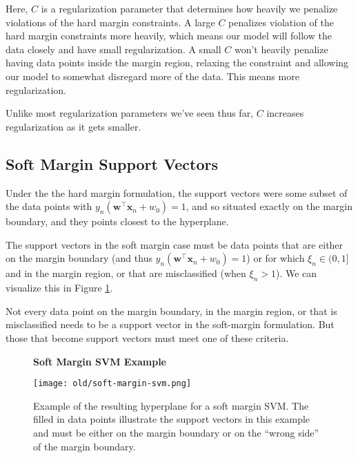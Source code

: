 Here, $C$ is a regularization parameter that determines how heavily we penalize violations of the hard margin constraints. A large $C$ penalizes violation of the hard margin constraints more heavily, which means our model will follow the data closely and have small regularization. A small $C$ won't heavily penalize having data points inside the margin region, relaxing the constraint and allowing our model to somewhat disregard more of the data. This means more regularization.

\begin{warning}
    Unlike most regularization parameters we've seen thus far, $C$ increases regularization as it gets smaller.
\end{warning}

\subsection{Soft Margin Support Vectors}
Under the the hard margin formulation, the support vectors were some subset of the  data points with $y_{n}(\textbf{w}^\top\textbf{x}_{n} + w_{0})=1$,
and so situated exactly on the margin boundary,  and  they points
closest to the hyperplane.

The support vectors in the soft margin case must be data points that are either  on the margin boundary (and thus $y_{n}(\textbf{w}^\top\textbf{x}_{n} + w_{0})=1$) or for which $\xi_n\in (0,1]$ and in the margin region, or that are misclassified (when $\xi_{n} > 1$). We can visualize this in Figure \ref{fig:soft-margin-svm}.


\begin{warning}
  Not every data point on the margin boundary, in the margin region, or that is misclassified needs to be a support vector in the soft-margin formulation. But those that become support vectors must meet one of these criteria.
\end{warning}
%
\begin{figure}
    \centering
    \textbf{Soft Margin SVM Example}\par\medskip
    \texttt{[image: old/soft-margin-svm.png]}
    \caption{Example of the resulting hyperplane for a soft margin SVM. The filled in data points illustrate the support vectors in this example and must be either on the margin boundary or on the ``wrong side'' of the margin boundary.}
    \label{fig:soft-margin-svm}
\end{figure}


